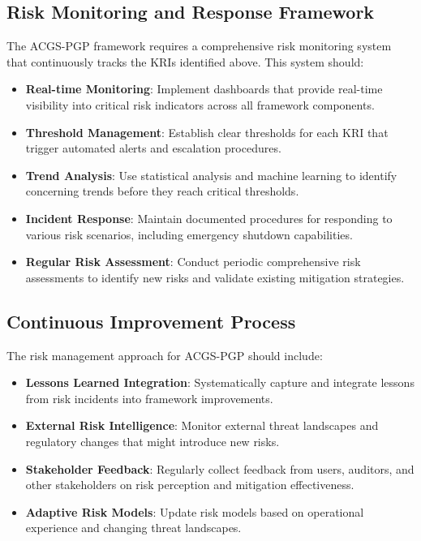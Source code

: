\documentclass[sigconf,review,anonymous=false]{acmart} %
\begin{document}
\subsection{Risk Monitoring and Response Framework}
The ACGS-PGP framework requires a comprehensive risk monitoring system that continuously tracks the KRIs identified above. This system should:

\begin{itemize}
    \item \textbf{Real-time Monitoring}: Implement dashboards that provide real-time visibility into critical risk indicators across all framework components.
    \item \textbf{Threshold Management}: Establish clear thresholds for each KRI that trigger automated alerts and escalation procedures.
    \item \textbf{Trend Analysis}: Use statistical analysis and machine learning to identify concerning trends before they reach critical thresholds.
    \item \textbf{Incident Response}: Maintain documented procedures for responding to various risk scenarios, including emergency shutdown capabilities.
    \item \textbf{Regular Risk Assessment}: Conduct periodic comprehensive risk assessments to identify new risks and validate existing mitigation strategies.
\end{itemize}

\subsection{Continuous Improvement Process}
The risk management approach for ACGS-PGP should include:

\begin{itemize}
    \item \textbf{Lessons Learned Integration}: Systematically capture and integrate lessons from risk incidents into framework improvements.
    \item \textbf{External Risk Intelligence}: Monitor external threat landscapes and regulatory changes that might introduce new risks.
    \item \textbf{Stakeholder Feedback}: Regularly collect feedback from users, auditors, and other stakeholders on risk perception and mitigation effectiveness.
    \item \textbf{Adaptive Risk Models}: Update risk models based on operational experience and changing threat landscapes.
\end{itemize}
\end{document}
